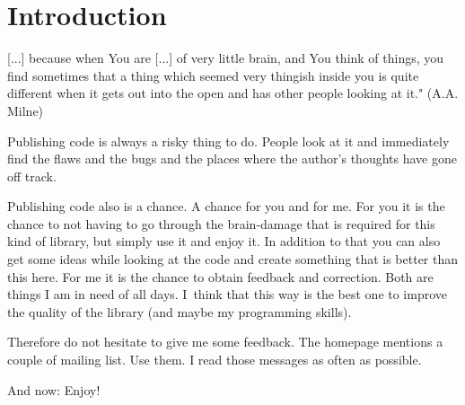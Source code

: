 \section{Introduction}
\label{sec: Introduction}

  \hfill
  \begin{minipage}[t]{0.4\textwidth}
    [...] because when You are [...] of very little brain, 
    and You think of things, you find sometimes that a thing 
    which seemed very thingish inside you is quite different 
    when it gets out into the open and has other
    people looking at it." 
    \hfill (A.A. Milne)
  \end{minipage}


\vspace{5em}

Publishing code is always a risky thing to do. People look at it and immediately
find the flaws and the bugs and the places where the author's thoughts have gone off track.

Publishing code also is a chance. A chance for you and for me. For you it is the
chance to not having to go through the brain-damage that is required for this
kind of library, but simply use it and enjoy it.  In addition to that you can also
get some ideas while looking at the code and create something that is
better than this here.  For me it is the chance to obtain feedback and
correction. Both are things I am in need of all days. I~think that this way is
the best one to improve the quality of the library (and maybe my programming skills).

Therefore do not hesitate to give me some feedback. The \Daixtrose homepage mentions
a couple of mailing list. Use them. I read those messages as often as possible.

And now: Enjoy!



